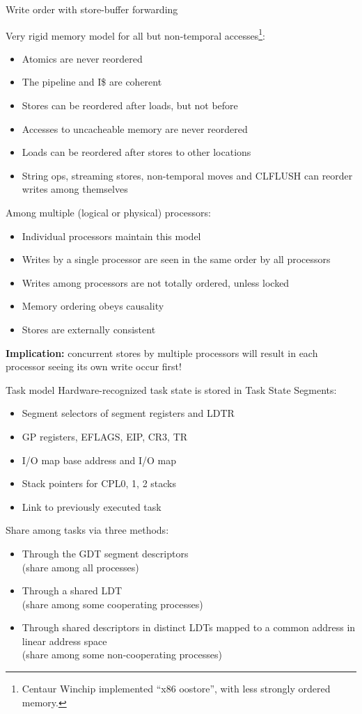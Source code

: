 \documentclass[mathserif,xcolor={dvipsnames,table}]{beamer}
\begin{document}
\begin{frame}{Write order with store-buffer forwarding}
\scriptsize{
Very rigid memory model for all but non-temporal accesses\footnote{\tiny{Centaur Winchip implemented ``x86 oostore'', with less strongly ordered memory.}}:
\begin{itemize}
\item Atomics are never reordered
\item The pipeline and I\$ are coherent
\item Stores can be reordered after loads, but not before
\item Accesses to uncacheable memory are never reordered
\item Loads can be reordered after stores to other locations
\item String ops, streaming stores, non-temporal moves and CLFLUSH can reorder
	writes among themselves
\end{itemize}
\vfill
Among multiple (logical or physical) processors:
\begin{itemize}
\item Individual processors maintain this model
\item Writes by a single processor are seen in the same order by all processors
\item Writes among processors are not totally ordered, unless locked
\item Memory ordering obeys causality
\item Stores are externally consistent
\end{itemize}
\textbf{Implication:} concurrent stores by multiple processors will result in
each processor seeing its own write occur first!
}
\end{frame}

\begin{frame}{Task model}
Hardware-recognized task state is stored in Task State Segments:
\begin{itemize}
\item Segment selectors of segment registers and LDTR
\item GP registers, EFLAGS, EIP, CR3, TR
\item I/O map base address and I/O map
\item Stack pointers for CPL0, 1, 2 stacks
\item Link to previously executed task
\end{itemize}
\vfill
Share among tasks via three methods:
\begin{itemize}
\item Through the GDT segment descriptors\\(share among all processes)
\item Through a shared LDT\\(share among some cooperating processes)
\item Through shared descriptors in distinct LDTs mapped to a common
	address in linear address space\\(share among some non-cooperating
	processes)
\end{itemize}
\end{frame}
\end{document}
